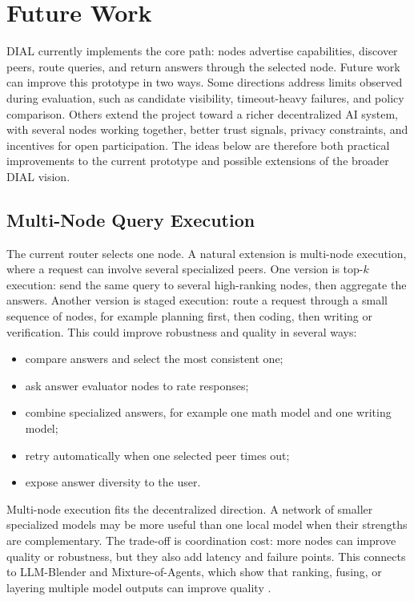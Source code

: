 \section{Future Work}

DIAL currently implements the core path: nodes advertise capabilities, discover
peers, route queries, and return answers through the selected node. Future work
can improve this prototype in two ways. Some directions address limits observed
during evaluation, such as candidate visibility, timeout-heavy failures, and
policy comparison. Others extend the project toward a richer decentralized AI
system, with several nodes working together, better trust signals, privacy
constraints, and incentives for open participation. The ideas below are
therefore both practical improvements to the current prototype and possible
extensions of the broader DIAL vision.

\subsection{Multi-Node Query Execution}

The current router selects one node. A natural extension is multi-node
execution, where a request can involve several specialized peers. One version
is top-\(k\) execution: send the same query to several high-ranking nodes, then
aggregate the answers. Another version is staged execution: route a request
through a small sequence of nodes, for example planning first, then coding,
then writing or verification. This could improve robustness and quality in
several ways:

\begin{itemize}
  \item compare answers and select the most consistent one;
  \item ask answer evaluator nodes to rate responses;
  \item combine specialized answers, for example one math model and one writing
  model;
  \item retry automatically when one selected peer times out;
  \item expose answer diversity to the user.
\end{itemize}

Multi-node execution fits the decentralized direction. A network of smaller
specialized models may be more useful than one local model when their strengths
are complementary. The trade-off is coordination cost: more nodes can improve
quality or robustness, but they also add latency and failure points. This
connects to LLM-Blender and Mixture-of-Agents, which show that ranking, fusing,
or layering multiple model outputs can improve quality
\citep{jiang2023llmblender,wang2024mixtureofagents}.

